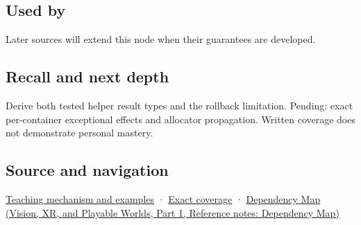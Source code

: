 \subsection{Used by}\label{appendix-c746afaa47d1-used-by}

\hypertarget{appendix-c746afaa47d1-used-by}{}

Later sources will extend this node when their guarantees are developed.

\subsection{Recall and next depth}\label{appendix-c746afaa47d1-recall-and-next-depth}

\hypertarget{appendix-c746afaa47d1-recall-and-next-depth}{}

Derive both tested helper result types and the rollback limitation. Pending: exact per-container exceptional effects and allocator propagation. Written coverage does not demonstrate personal mastery.

\subsection{Source and navigation}\label{appendix-c746afaa47d1-source-and-navigation}

\hypertarget{appendix-c746afaa47d1-source-and-navigation}{}

\hyperref[01-foundations-i-ch003-failure-guarantees-shape-the-transfer-algorithm]{Teaching mechanism and examples} · \hyperref[appendix-fd090d982a15-m009---parts-127-147]{Exact coverage} · \href{../07-Vision-XR-and-Playable-Worlds-P01/main.pdf\#nameddest=appendix-4ad47bdd269a}{Dependency Map (Vision, XR, and Playable Worlds, Part 1, Reference notes: Dependency Map)}
